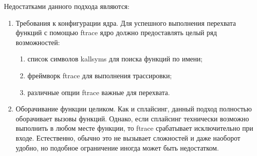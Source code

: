 		Недостатками данного подхода являются:
		\begin{enumerate}
			\item Требования к конфигурации ядра. 
			Для успешного выполнения перехвата функций с помощью ftrace ядро должно предоставлять целый ряд возможностей:
			\begin{enumerate}
				\item список символов kallsyms для поиска функций по имени;
				\item фреймворк ftrace для выполнения трассировки;
				\item различные опции ftrace важные для перехвата.
			\end{enumerate}
			\item Оборачивание функции целиком. 
				Как и сплайсинг, данный подход полностью оборачивает вызовы функций.
				Однако, если сплайсинг технически возможно выполнить в любом месте функции,
				то ftrace срабатывает исключительно при входе. 
				Естественно, обычно это не вызывает сложностей и даже наоборот удобно,
				но подобное ограничение иногда может быть недостатком.
		\end{enumerate}

